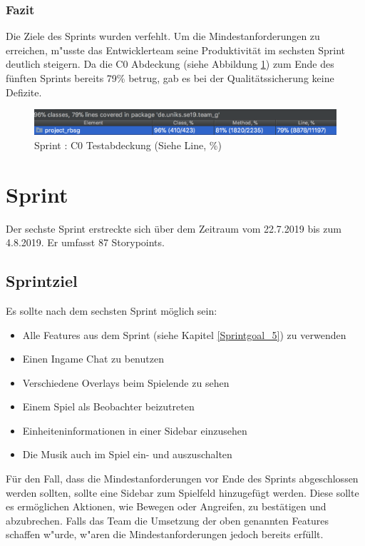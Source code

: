 \documentclass[12pt, titlepage]{scrartcl}
\newcommand{\RN}[1]{%
	\textup{\uppercase\expandafter{\romannumeral#1}}%
}
\begin{document}
        	\subsubsection{Fazit}
        		Die Ziele des Sprints wurden verfehlt. Um die Mindestanforderungen zu erreichen, m"usste das Entwicklerteam seine Produktivit\"at im sechsten Sprint deutlich steigern. Da die C0 Abdeckung (siehe Abbildung \ref{Coverage_5}) zum Ende des f\"unften Sprints bereits 79\% betrug, gab es bei der Qualit\"atssicherung keine Defizite.
        		\begin{figure}[H] 
        			\centering
        			\includegraphics[width=\textwidth]{images/sprintV/coverage.png}
        			\caption{Sprint \RN{5}: C0 Testabdeckung (Siehe Line, \%)}
        			\label{Coverage_5}
        		\end{figure} 
    \newpage
    \section{Sprint \RN{6}}
    	Der sechste Sprint erstreckte sich \"uber dem Zeitraum vom 22.7.2019 bis zum 4.8.2019. Er umfasst 87 Storypoints.
    	\subsection{Sprintziel}
    		Es sollte nach dem sechsten Sprint m\"oglich sein:
    		\begin{itemize}
    			\item Alle Features aus dem Sprint \RN{5} (siehe Kapitel \ref{Sprintgoal_5}) zu verwenden
    			\item Einen Ingame Chat zu benutzen
    			\item Verschiedene Overlays beim Spielende zu sehen
    			\item Einem Spiel als Beobachter beizutreten
    			\item Einheiteninformationen in einer Sidebar einzusehen
    			\item Die Musik auch im Spiel ein- und auszuschalten
    		\end{itemize}
    		F\"ur den Fall, dass die Mindestanforderungen vor Ende des Sprints abgeschlossen werden sollten, sollte eine Sidebar zum Spielfeld hinzugef\"ugt werden. Diese sollte es erm\"oglichen Aktionen, wie Bewegen oder Angreifen, zu best\"atigen und abzubrechen. Falls das Team die Umsetzung der oben genannten Features schaffen w"urde, w"aren die Mindestanforderungen jedoch bereits erf\"ullt.
\end{document}
